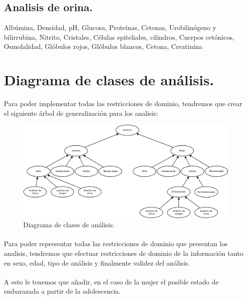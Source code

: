 \documentclass[a4paper,10pt]{article}
\begin{document}
\subsection{Analisis de orina.}
Albúmina, Densidad, pH, Glucosa, Proteínas, Cetonas, Urobilinógeno y bilirrubina, Nitrito, Cristales, Células epiteliales, cilindros, Cuerpos cetónicos, Osmolalidad, Glóbulos rojos, Glóbulos blancos, Cetona, Creatinina
\pagebreak

\section{Diagrama de clases de análisis.}
\paragraph{}
Para poder implementar todas las restricciones de dominio, tendremos que crear el siguiente árbol de generalización para los analisis:\\
\begin{figure}[hbt]
	\includegraphics[width=\textwidth]{img/analisis.png}
	\caption{Diagrama de clases de análisis.}
	\label{fig:diagramaanalisis}
\end{figure}
\paragraph{}
Para poder representar todas las restricciones de dominio que presentan los analisis, tendremos que efectuar restricciones de dominio de la información tanto en sexo, edad, tipo de análisis y finalmente validez del análisis.
\paragraph{}
A esto le tenemos que añadir, en el caso de la mujer el posible estado de embarazada a partir de la adolescencia.
\end{document}
